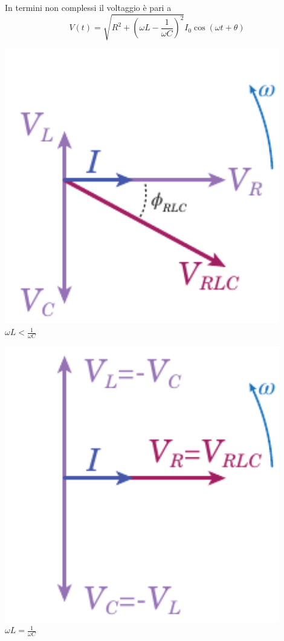 In termini non complessi il voltaggio è pari a
\begin{equation*}
	V(t)=\sqrt{R^2+\left(\omega L-\frac{1}{\omega C}\right)^2}I_0\cos(\omega t +\theta)
\end{equation*}
\begin{minipage}{0.33\textwidth}
	\begin{center}
		\includegraphics[width=0.9\textwidth]{images/chp11/chp11fasoriRLC2.pdf}
		$\omega L<\frac{1}{\omega C}$
	\end{center}
\end{minipage}
\begin{minipage}{0.33\textwidth}
	\begin{center}
		\includegraphics[width=0.9\textwidth]{images/chp11/chp11fasoriRLC3.pdf}
		$\omega L=\frac{1}{\omega C}$
	\end{center}
\end{minipage}
